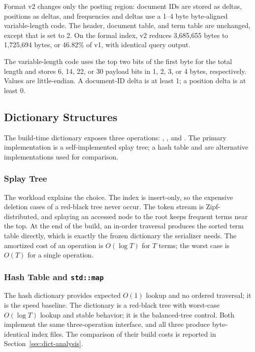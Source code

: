 Format v2 changes only the posting region: document IDs are stored as deltas,
positions as deltas, and frequencies and deltas use a 1--4 byte byte-aligned
variable-length code. The header, document table, and term table are unchanged,
except that  is set to 2. On the formal index, v2 reduces
3,685,655 bytes to 1,725,694 bytes, or 46.82\% of v1, with identical query
output.

The variable-length code uses the top two bits of the first byte for the total
length and stores 6, 14, 22, or 30 payload bits in 1, 2, 3, or 4 bytes,
respectively. Values are little-endian. A document-ID delta is at least 1; a
position delta is at least 0.

\subsection{Dictionary Structures}
\label{sec:dict}

The build-time dictionary exposes three operations: ,
, and . The primary implementation is a
self-implemented splay tree; a hash table and  are alternative
implementations used for comparison.

\subsubsection{Splay Tree}

The workload explains the choice. The index is insert-only, so the expensive
deletion cases of a red-black tree never occur. The token stream is
Zipf-distributed, and splaying an accessed node to the root keeps frequent terms
near the top. At the end of the build, an in-order traversal produces the sorted
term table directly, which is exactly the frozen dictionary the serializer
needs. The amortized cost of an operation is $O(\log T)$ for $T$ terms; the
worst case is $O(T)$ for a single operation.

\subsubsection{Hash Table and \texttt{std::map}}

The hash dictionary provides expected $O(1)$ lookup and no ordered traversal;
it is the speed baseline. The  dictionary is a red-black tree
with worst-case $O(\log T)$ lookup and stable behavior; it is the balanced-tree
control. Both implement the same three-operation interface, and all three
produce byte-identical index files. The comparison of their build costs is
reported in Section~\ref{sec:dict-analysis}.

